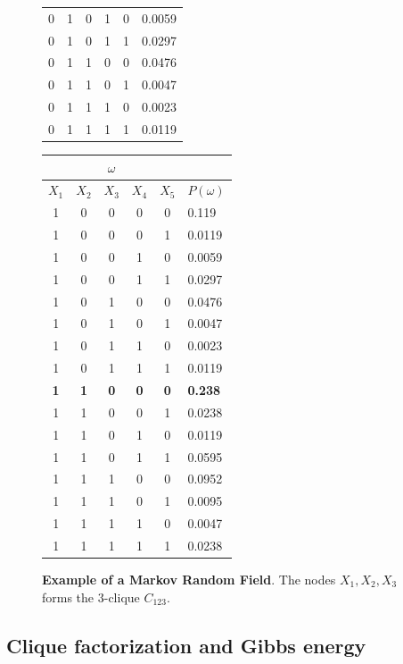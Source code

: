\begin{figure}
\begin{minipage}{0.35\textwidth}
\begin{tabular}{|c|c|c|c|c|l|}
0 & 1 & 0 & 1 & 0 & 0.0059 \\
0 & 1 & 0 & 1 & 1 & 0.0297 \\
0 & 1 & 1 & 0 & 0 & 0.0476 \\
0 & 1 & 1 & 0 & 1 & 0.0047 \\
0 & 1 & 1 & 1 & 0 & 0.0023 \\
0 & 1 & 1 & 1 & 1 & 0.0119 \\
\hline
\end{tabular}
\end{minipage}%
\begin{minipage}{0.35\textwidth}
\tiny
\begin{tabular}{|c|c|c|c|c|l|}
\hline
\multicolumn{5}{|c|}{$\omega$} &\\
\hline
$X_1$ & $X_2$ & $X_3$ & $X_4$ & $X_5$ & $P(\omega)$\\
\hline
1 & 0 & 0 & 0 & 0 & 0.119 \\
1 & 0 & 0 & 0 & 1 & 0.0119 \\
1 & 0 & 0 & 1 & 0 & 0.0059 \\
1 & 0 & 0 & 1 & 1 & 0.0297 \\
1 & 0 & 1 & 0 & 0 & 0.0476 \\
1 & 0 & 1 & 0 & 1 & 0.0047 \\
1 & 0 & 1 & 1 & 0 & 0.0023 \\
1 & 0 & 1 & 1 & 1 & 0.0119 \\
\textbf{1} & \textbf{1} & \textbf{0} & \textbf{0} & \textbf{0} & \textbf{0.238} \\
1 & 1 & 0 & 0 & 1 & 0.0238 \\
1 & 1 & 0 & 1 & 0 & 0.0119 \\
1 & 1 & 0 & 1 & 1 & 0.0595 \\
1 & 1 & 1 & 0 & 0 & 0.0952 \\
1 & 1 & 1 & 0 & 1 & 0.0095 \\
1 & 1 & 1 & 1 & 0 & 0.0047 \\
1 & 1 & 1 & 1 & 1 & 0.0238 \\
\hline
\end{tabular}
\end{minipage}
\caption{\textbf{Example of a Markov Random Field}. The nodes $X_1, X_2, X_3$ forms the $3$-clique $C_{123}$.}
\label{ch2:fig:example-mrf}
\end{figure}

\subsection{Clique factorization and Gibbs energy}

